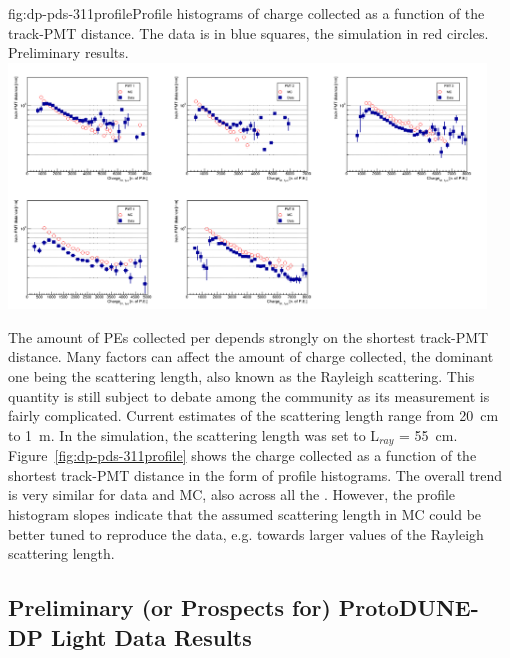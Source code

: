 \begin{dunefigure}{fig:dp-pds-311profile}{Profile histograms of charge collected as a function of the track-PMT distance. The data is in blue squares, the simulation in red circles. Preliminary results.}
\includegraphics[width=0.95\textwidth]{graphics/dppd_7_4.png}
\end{dunefigure}


The amount of PEs collected per  depends strongly on the shortest track-PMT distance. Many factors can affect the amount of charge collected, the dominant one being the scattering length, also known as the Rayleigh scattering. This quantity is still subject to debate among the  community as its measurement is fairly complicated. Current estimates of the scattering length range from \SI{20}{\cm} to \SI{1}{\m}.
In the  simulation, the scattering length was set to L$_{ray}$ = \SI{55}{\cm}.
Figure~\ref{fig:dp-pds-311profile} shows the charge collected as a function of the shortest track-PMT distance in the form of profile histograms. The overall trend is very similar for data and MC, also across all the . However, the profile histogram slopes indicate that the assumed scattering length in MC could be better tuned to reproduce the data, e.g. towards larger values of the Rayleigh scattering length.


\subsection{Preliminary (or Prospects for) ProtoDUNE-DP Light Data Results}

